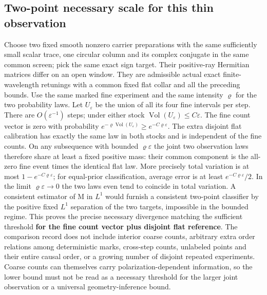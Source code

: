 \documentclass[11pt]{article}
\begin{document}
\subsection{Two-point necessary scale for this thin observation}\label{two-point-necessary-scale-for-this-thin-observation}

Choose two fixed smooth nonzero carrier preparations with the same sufficiently small scalar trace, one circular column and its complex conjugate in the same common screen; pick the same exact sign target. Their positive-ray Hermitian matrices differ on an open window. They are admissible actual exact finite-wavelength retunings with a common fixed flat collar and all the preceding bounds. Use the same marked fine experiment and the same intensity \(\varrho\) for the two probability laws. Let \(U_\varepsilon\) be the union of all its four fine intervals per step. There are \(O(\varepsilon^{-1})\) steps; under either stock \(\operatorname{Vol}(U_\varepsilon)\le C\varepsilon\). The fine count vector is zero with probability
\(e^{-\varrho\operatorname{Vol}(U_\varepsilon)}\ge e^{-C\varrho\varepsilon}\).
The extra disjoint flat calibration has exactly the same law in both stocks and is independent of the fine counts. On any subsequence with bounded \(\varrho\varepsilon\) the joint two observation laws therefore share at least a fixed positive mass: their common component is the all-zero fine event times the identical flat law. More precisely total variation is at most \(1-e^{-C\varrho\varepsilon}\); for equal-prior classification, average error is at least \(e^{-C\varrho\varepsilon}/2\). In the limit \(\varrho\varepsilon\to0\) the two laws even tend to coincide in total variation. A consistent estimator of M in \(L^1\) would furnish a consistent two-point classifier by the positive fixed \(L^1\) separation of the two targets, impossible in the bounded regime. This proves the precise necessary divergence matching the sufficient threshold \textbf{for the fine count vector plus disjoint flat reference}. The comparison record does not include interior coarse counts, arbitrary extra order relations among deterministic marks, cross-step counts, unlabeled points and their entire causal order, or a growing number of disjoint repeated experiments. Coarse counts can themselves carry polarization-dependent information, so the lower bound must not be read as a necessary threshold for the larger joint observation or a universal geometry-inference bound.
\end{document}
